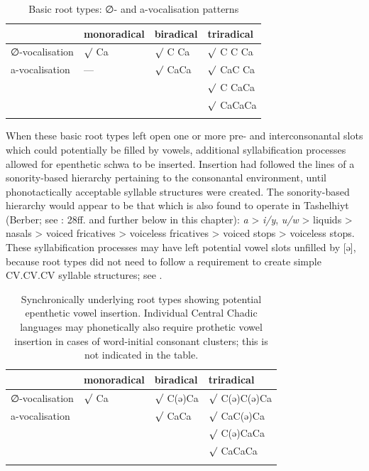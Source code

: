 \documentclass[output=paper]{langscibook}
\begin{document}
\begin{table}
\caption{Basic root types: ∅- and a-vocalisation patterns}
\label{tab:wolff:1}
\begin{tabular}{llll}
\lsptoprule
 & monoradical & biradical & triradical\\
 \midrule
∅-vocalisation & ${\surd}$ Ca & ${\surd}$ C Ca & ${\surd}$ C C Ca\\
a-vocalisation & --- & ${\surd}$ CaCa & ${\surd}$ CaC Ca\\
&  &  & ${\surd}$ C CaCa\\
&  &  & ${\surd}$ CaCaCa\\
\lspbottomrule
\end{tabular}
\end{table}

When these basic root types left open one or more pre- and interconsonantal slots which could potentially be filled by vowels, additional syllabification processes allowed for epenthetic schwa to be inserted. Insertion had followed the lines of a sonority-based hierarchy pertaining to the consonantal environment, until phonotactically acceptable syllable structures were created. The sonority-based hierarchy would appear to be that which is also found to operate in Tashelhiyt (Berber; see \citealt{Kossmann2012}: 28ff. and further below in this chapter): \textit{a} > \textit{i/y}, \textit{u/w} > liquids > nasals > voiced fricatives > voiceless fricatives > voiced stops > voiceless stops. These syllabification processes may have left potential vowel slots unfilled by [ə], because root types did not need to follow a requirement to create simple CV.CV.CV syllable structures; see .

\begin{table}
\caption{Synchronically underlying root types showing potential epenthetic vowel insertion. Individual Central Chadic languages may phonetically also require prothetic vowel insertion in cases of word-initial consonant clusters; this is not indicated in the table.}
\label{tab:wolff:2}
\begin{tabular}{llll}
\lsptoprule
 & monoradical & biradical & triradical\\
 \midrule
∅-vocalisation & ${\surd}$ Ca & ${\surd}$ C(ə)Ca & ${\surd}$ C(ə)C(ə)Ca \\
 a-vocalisation &  & ${\surd}$ CaCa & ${\surd}$ CaC(ə)Ca \\
 &  &  & ${\surd}$ C(ə)CaCa\\
 &  &  & ${\surd}$ CaCaCa\\
\lspbottomrule
\end{tabular}
\end{table}
\end{document}
